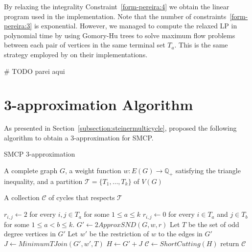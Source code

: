 By relaxing the integrality Constraint~\eqref{form-pereira:4} we obtain the linear program used in the implementation. Note that the number of constraints~\eqref{form-pereira:3} is exponential. However, we managed to compute the relaxed LP in polynomial time by using Gomory-Hu trees to solve maximum flow problems between each pair of vertices in the same terminal set \(T_a\). This is the same strategy employed by \cite{Pereira2018TheSM} on their implementations.

# TODO parei aqui

\section{3-approximation Algorithm}

As presented in Section~\ref{subsection:steinermulticycle}, \cite{smcp_3apx} proposed the following algorithm to obtain a 3-approximation for SMCP.

\begin{algorithm}
\caption{SMCP 3-approximation}
\label{algorithm:smcp-3-apx}
\begin{algorithmic}[1]

\Require A complete graph \(G\), a weight function \(w: E(G) \rightarrow \mathbb{Q}_+\) satisfying the triangle inequality, and a partition \(\mathcal{T} = \{T_1, \dots, T_k\}\) of \(V(G)\)

\Ensure A collection \(\mathcal{C}\) of cycles that respects \(\mathcal{T}\)

\State \(r_{i, j} \gets 2\) for every \(i, j \in T_a\) for some \(1 \leq a \leq  k\)
\State \(r_{i, j} \gets 0\) for every \(i \in T_a\) and \(j \in T_b\) for some \(1 \leq a < b \leq k\).
\State \(G' \gets 2ApproxSND(G, w, r)\) \label{alg:3-apx:snd-2-apx}
\State Let \(T\) be the set of odd degree vertices in \(G'\)
\State Let \(w'\) be the restriction of \(w\) to the edges in \(G'\)
\State \(J \gets MinimumTJoin(G', w', T)\) \label{alg:3-apx:t-join}
\State \(H \gets G' + J\)
\State \(\mathcal{C} \gets ShortCutting(H)\) \label{alg:3-apx:shortcutting}
\State return \(\mathcal{C}\)


\end{algorithmic}
\end{algorithm}



